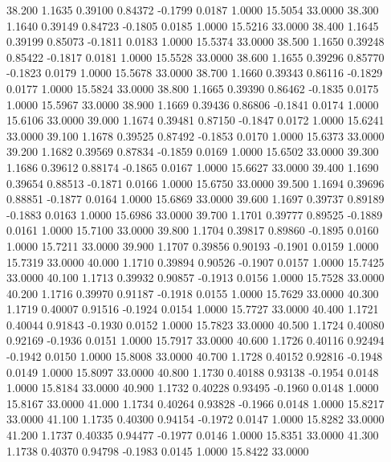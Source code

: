   38.200   1.1635   0.39100   0.84372  -0.1799   0.0187   1.0000  15.5054  33.0000
  38.300   1.1640   0.39149   0.84723  -0.1805   0.0185   1.0000  15.5216  33.0000
  38.400   1.1645   0.39199   0.85073  -0.1811   0.0183   1.0000  15.5374  33.0000
  38.500   1.1650   0.39248   0.85422  -0.1817   0.0181   1.0000  15.5528  33.0000
  38.600   1.1655   0.39296   0.85770  -0.1823   0.0179   1.0000  15.5678  33.0000
  38.700   1.1660   0.39343   0.86116  -0.1829   0.0177   1.0000  15.5824  33.0000
  38.800   1.1665   0.39390   0.86462  -0.1835   0.0175   1.0000  15.5967  33.0000
  38.900   1.1669   0.39436   0.86806  -0.1841   0.0174   1.0000  15.6106  33.0000
  39.000   1.1674   0.39481   0.87150  -0.1847   0.0172   1.0000  15.6241  33.0000
  39.100   1.1678   0.39525   0.87492  -0.1853   0.0170   1.0000  15.6373  33.0000
  39.200   1.1682   0.39569   0.87834  -0.1859   0.0169   1.0000  15.6502  33.0000
  39.300   1.1686   0.39612   0.88174  -0.1865   0.0167   1.0000  15.6627  33.0000
  39.400   1.1690   0.39654   0.88513  -0.1871   0.0166   1.0000  15.6750  33.0000
  39.500   1.1694   0.39696   0.88851  -0.1877   0.0164   1.0000  15.6869  33.0000
  39.600   1.1697   0.39737   0.89189  -0.1883   0.0163   1.0000  15.6986  33.0000
  39.700   1.1701   0.39777   0.89525  -0.1889   0.0161   1.0000  15.7100  33.0000
  39.800   1.1704   0.39817   0.89860  -0.1895   0.0160   1.0000  15.7211  33.0000
  39.900   1.1707   0.39856   0.90193  -0.1901   0.0159   1.0000  15.7319  33.0000
  40.000   1.1710   0.39894   0.90526  -0.1907   0.0157   1.0000  15.7425  33.0000
  40.100   1.1713   0.39932   0.90857  -0.1913   0.0156   1.0000  15.7528  33.0000
  40.200   1.1716   0.39970   0.91187  -0.1918   0.0155   1.0000  15.7629  33.0000
  40.300   1.1719   0.40007   0.91516  -0.1924   0.0154   1.0000  15.7727  33.0000
  40.400   1.1721   0.40044   0.91843  -0.1930   0.0152   1.0000  15.7823  33.0000
  40.500   1.1724   0.40080   0.92169  -0.1936   0.0151   1.0000  15.7917  33.0000
  40.600   1.1726   0.40116   0.92494  -0.1942   0.0150   1.0000  15.8008  33.0000
  40.700   1.1728   0.40152   0.92816  -0.1948   0.0149   1.0000  15.8097  33.0000
  40.800   1.1730   0.40188   0.93138  -0.1954   0.0148   1.0000  15.8184  33.0000
  40.900   1.1732   0.40228   0.93495  -0.1960   0.0148   1.0000  15.8167  33.0000
  41.000   1.1734   0.40264   0.93828  -0.1966   0.0148   1.0000  15.8217  33.0000
  41.100   1.1735   0.40300   0.94154  -0.1972   0.0147   1.0000  15.8282  33.0000
  41.200   1.1737   0.40335   0.94477  -0.1977   0.0146   1.0000  15.8351  33.0000
  41.300   1.1738   0.40370   0.94798  -0.1983   0.0145   1.0000  15.8422  33.0000
